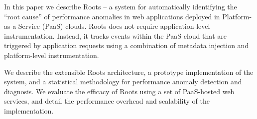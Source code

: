 In this paper we describe Roots -- a system for automatically identifying the
``root cause'' of performance anomalies in web applications deployed
in Platform-as-a-Service (PaaS) clouds.
Roots does not require
application-level instrumentation.  Instead, it tracks events within the PaaS
cloud that are triggered by application requests using a
combination of metadata injection and platform-level instrumentation.

We describe the extensible Roots architecture, a prototype implementation 
of the system, and a statistical methodology for performance anomaly
detection and diagnosis.  We evaluate the efficacy of Roots
using a set of PaaS-hosted web services, and detail the performance
overhead and scalability of the implementation.

